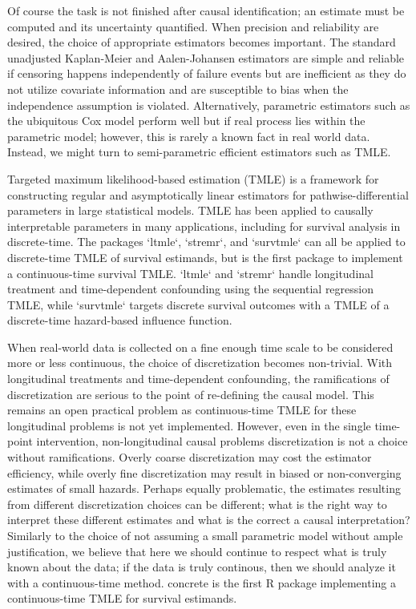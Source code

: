 \documentclass{report}
\newcommand{\1}{\ensuremath{\mathbf{1}}}
\begin{document}
Of course the task is not finished after causal identification; an estimate must be computed and its uncertainty quantified. When precision and reliability are desired, the choice of appropriate estimators becomes important. The standard unadjusted Kaplan-Meier and Aalen-Johansen estimators are simple and reliable if censoring happens independently of failure events but are inefficient as they do not utilize covariate information and are susceptible to bias when the independence assumption is violated. Alternatively, parametric estimators such as the ubiquitous Cox model perform well but if real process lies within the parametric model; however, this is rarely a known fact in real world data. Instead, we might turn to semi-parametric efficient estimators such as TMLE.

Targeted maximum likelihood-based estimation (TMLE) is a framework for constructing regular and asymptotically linear estimators for pathwise-differential parameters in large statistical models. TMLE has been applied to causally interpretable parameters in many applications, including for survival analysis in discrete-time. The packages `ltmle`, `stremr`, and `survtmle` can all be applied to discrete-time TMLE of survival estimands, but  is the first package to implement a continuous-time survival TMLE. `ltmle` and `stremr` handle longitudinal treatment and time-dependent confounding using the sequential regression TMLE, while `survtmle` targets discrete survival outcomes with a TMLE of a discrete-time hazard-based influence function.

When real-world data is collected on a fine enough time scale to be considered more or less continuous, the choice of discretization becomes non-trivial. With longitudinal treatments and time-dependent confounding, the ramifications of discretization are serious to the point of re-defining the causal model. This remains an open practical problem as continuous-time TMLE for these longitudinal problems is not yet implemented. However, even in the single time-point intervention, non-longitudinal causal problems discretization is not a choice without ramifications. Overly coarse discretization may cost the estimator efficiency, while overly fine discretization may result in biased or non-converging estimates of small hazards. Perhaps equally problematic, the estimates resulting from different discretization choices can be different; what is the right way to interpret these different estimates and what is the correct a causal interpretation? Similarly to the choice of not assuming a small parametric model without ample justification, we believe that here we should continue to respect what is truly known about the data; if the data is truly continous, then we should analyze it with a continuous-time method. concrete is the first R package implementing a continuous-time TMLE for survival estimands.


\newpage

\end{document}

